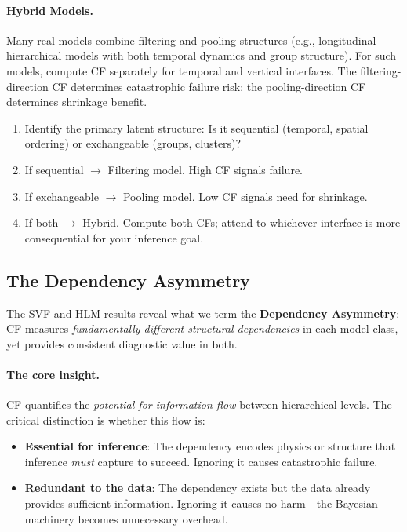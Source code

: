 \documentclass[10pt]{article} %
\theoremstyle{plain}
\theoremstyle{definition}
\begin{document}
\paragraph{Hybrid Models.} Many real models combine filtering and pooling structures (e.g., longitudinal hierarchical models with both temporal dynamics and group structure). For such models, compute CF separately for temporal and vertical interfaces. The filtering-direction CF determines catastrophic failure risk; the pooling-direction CF determines shrinkage benefit.

\begin{tcolorbox}[breakable, colback=gray!5, colframe=black!75, title=\textbf{Model Classification Procedure}, fonttitle=\bfseries]
\begin{enumerate}
    \item Identify the primary latent structure: Is it sequential (temporal, spatial ordering) or exchangeable (groups, clusters)?
    \item If sequential $\to$ Filtering model. High CF signals failure.
    \item If exchangeable $\to$ Pooling model. Low CF signals need for shrinkage.
    \item If both $\to$ Hybrid. Compute both CFs; attend to whichever interface is more consequential for your inference goal.
\end{enumerate}
\end{tcolorbox}

\subsection{The Dependency Asymmetry}

The SVF and HLM results reveal what we term the \textbf{Dependency Asymmetry}: CF measures \emph{fundamentally different structural dependencies} in each model class, yet provides consistent diagnostic value in both.

\paragraph{The core insight.} CF quantifies the \emph{potential for information flow} between hierarchical levels. The critical distinction is whether this flow is:
\begin{itemize}
    \item \textbf{Essential for inference}: The dependency encodes physics or structure that inference \emph{must} capture to succeed. Ignoring it causes catastrophic failure.
    \item \textbf{Redundant to the data}: The dependency exists but the data already provides sufficient information. Ignoring it causes no harm---the Bayesian machinery becomes unnecessary overhead.
\end{itemize}
\end{document}
